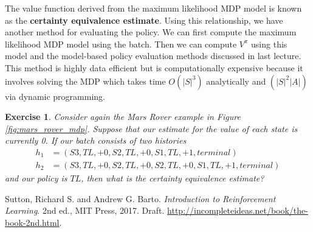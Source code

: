 \documentclass{article}
\newtheorem{exercise}{Exercise}[section]
\begin{document}
The value function derived from the maximum likelihood MDP model is known as the \textbf{certainty equivalence estimate}.  Using this relationship, we have another method for evaluating the policy.  We can first compute the maximum likelihood MDP model using the batch.  Then we can compute $V^\pi$ using this model and the model-based policy evaluation methods discussed in last lecture.  This method is highly data efficient but is computationally expensive because it involves solving the MDP which takes time $O(|S|^3)$ analytically and $(|S|^2|A|)$ via dynamic programming.

\begin{exercise}
Consider again the Mars Rover example in Figure \ref{fig:mars_rover_mdp}.  Suppose that our estimate for the value of each state is currently 0.  If our batch consists of two histories
\begin{align*}
h_1 &= (S3, TL, +0, S2, TL, +0, S1, TL, +1, terminal) \\
h_2 &= (S3, TL, +0, S2, TL, +0, S2, TL, +0, S1, TL, +1, terminal)
\end{align*}
and our policy is $TL$, then what is the certainty equivalence estimate?
\end{exercise}


\begin{thebibliography}{9}

 Sutton, Richard S. and Andrew G. Barto. \emph{Introduction to Reinforcement Learning}. 2nd ed., MIT Press, 2017. Draft. \url{http://incompleteideas.net/book/the-book-2nd.html}.


\end{thebibliography}
\end{document}
